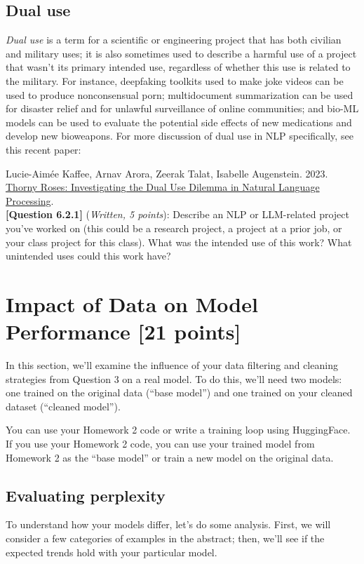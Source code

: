 \documentclass[leqno,12pt]{article}
\begin{document}
\subsection{Dual use}
\noindent  \textit{Dual use} is a term for a scientific or engineering project that has both civilian and military uses; it is also sometimes used to describe a harmful use of a project that wasn't its primary intended use, regardless of whether this use is related to the military. For instance, deepfaking toolkits used to make joke videos can be used to produce nonconsensual porn; multidocument summarization can be used for disaster relief and for unlawful surveillance of online communities; and bio-ML models can be used to evaluate the potential side effects of new medications and develop new bioweapons. 
For more discussion of dual use in NLP specifically, see this recent paper:

Lucie-Aimée Kaffee, Arnav Arora, Zeerak Talat, Isabelle Augenstein. 2023. \href{https://arxiv.org/abs/2304.08315}{Thorny Roses: Investigating the Dual Use Dilemma in Natural Language Processing}.\\

\noindent \textbf{[Question 6.2.1]} (\emph{Written, 5 points}): Describe an NLP or LLM-related project you've worked on (this could be a research project, a project at a prior job, or your class project for this class). What was the intended use of this work? What unintended uses could this work have? 
\begin{tcolorbox}[fit,height=10cm,  blank, borderline={1pt}{-2pt}]
\end{tcolorbox}



\section{Impact of Data on Model Performance [21 points]}

\noindent In this section, we'll examine the influence of your data filtering and cleaning strategies from Question 3 on a real model. To do this, we'll need two models: one trained on the original data (``base model'') and one trained on your cleaned dataset (``cleaned model''). 

You can use your Homework 2 code or write a training loop using HuggingFace. If you use your Homework 2 code, you can use your trained model from Homework 2 as the ``base model'' or train a new model on the original data.

\subsection{Evaluating perplexity}
To understand how your models differ, let's do some analysis. First, we will consider a few categories of examples in the abstract; then, we'll see if the expected trends hold with your particular model. 
\end{document}
